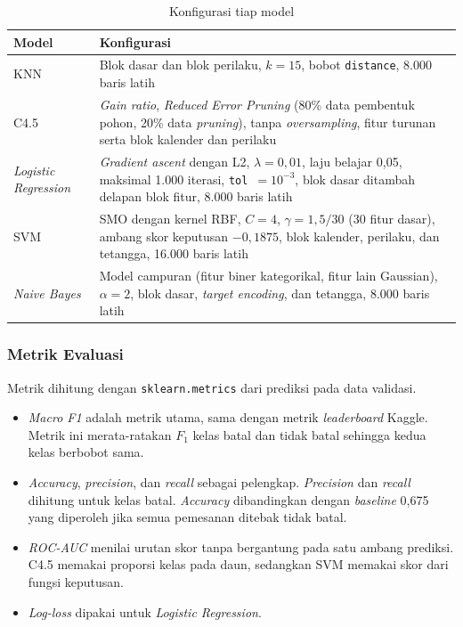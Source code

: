 \begin{table}[H]
\centering
\small
\caption{Konfigurasi tiap model}
\label{tab:param}

\begin{tabularx}{\textwidth}{@{}lX@{}}
\toprule
Model & Konfigurasi \\
\midrule
KNN & Blok dasar dan blok perilaku, $k=15$, bobot \texttt{distance}, 8.000 baris latih \\
C4.5 & \textit{Gain ratio}, \textit{Reduced Error Pruning} (80\% data pembentuk pohon, 20\% data \textit{pruning}), tanpa \textit{oversampling}, fitur turunan serta blok kalender dan perilaku \\
\textit{Logistic Regression} & \textit{Gradient ascent} dengan L2, $\lambda=0{,}01$, laju belajar 0,05, maksimal 1.000 iterasi, \texttt{tol}~$=10^{-3}$, blok dasar ditambah delapan blok fitur, 8.000 baris latih \\
SVM & SMO dengan kernel RBF, $C=4$, $\gamma=1{,}5/30$ (30 fitur dasar), ambang skor keputusan $-0{,}1875$, blok kalender, perilaku, dan tetangga, 16.000 baris latih \\
\textit{Naive Bayes} & Model campuran (fitur biner kategorikal, fitur lain Gaussian), $\alpha=2$, blok dasar, \textit{target encoding}, dan tetangga, 8.000 baris latih \\
\bottomrule
\end{tabularx}
\end{table}

\subsubsection{Metrik Evaluasi}

Metrik dihitung dengan \texttt{sklearn.metrics} dari prediksi pada data
validasi.

\begin{itemize}
    \item \textit{Macro F1} adalah metrik utama, sama dengan metrik
        \textit{leaderboard} Kaggle. Metrik ini merata-ratakan $F_1$ kelas batal
        dan tidak batal sehingga kedua kelas berbobot sama.
    \item \textit{Accuracy}, \textit{precision}, dan \textit{recall} sebagai
        pelengkap. \textit{Precision} dan \textit{recall} dihitung untuk kelas
        batal. \textit{Accuracy} dibandingkan dengan \textit{baseline} 0,675
        yang diperoleh jika semua pemesanan ditebak tidak batal.
    \item \textit{ROC-AUC} menilai urutan skor tanpa bergantung pada satu
        ambang prediksi. C4.5 memakai proporsi kelas pada daun, sedangkan
        SVM memakai skor dari fungsi keputusan.
    \item \textit{Log-loss} dipakai untuk \textit{Logistic Regression}.
\end{itemize}

